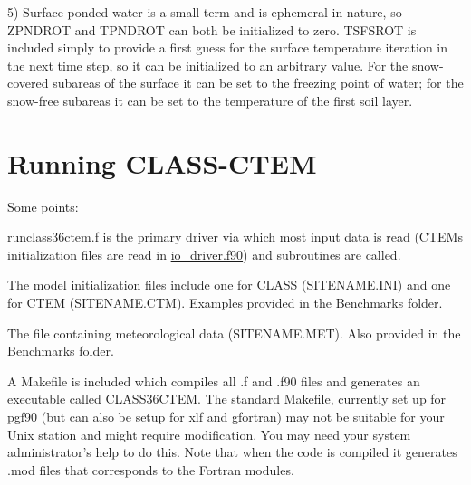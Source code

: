 5) Surface ponded water is a small term and is ephemeral in nature, so Z\+P\+N\+D\+R\+O\+T and T\+P\+N\+D\+R\+O\+T can both be initialized to zero. T\+S\+F\+S\+R\+O\+T is included simply to provide a first guess for the surface temperature iteration in the next time step, so it can be initialized to an arbitrary value. For the snow-\/covered subareas of the surface it can be set to the freezing point of water; for the snow-\/free subareas it can be set to the temperature of the first soil layer.\hypertarget{index_runStandAloneMode}{}\section{Running C\+L\+A\+S\+S-\/\+C\+T\+E\+M}\label{index_runStandAloneMode}
Some points\+:
\begin{DoxyEnumerate}
\item runclass36ctem.\+f is the primary driver via which most input data is read (C\+T\+E\+M\textquotesingle{}s initialization files are read in \hyperlink{io__driver_8f90}{io\+\_\+driver.\+f90}) and subroutines are called.
\item The model initialization files include one for C\+L\+A\+S\+S (S\+I\+T\+E\+N\+A\+M\+E.\+I\+N\+I) and one for C\+T\+E\+M (S\+I\+T\+E\+N\+A\+M\+E.\+C\+T\+M). Examples provided in the Benchmarks folder.
\item The file containing meteorological data (S\+I\+T\+E\+N\+A\+M\+E.\+M\+E\+T). Also provided in the Benchmarks folder.
\item A Makefile is included which compiles all .f and .f90 files and generates an executable called C\+L\+A\+S\+S36\+C\+T\+E\+M. The standard Makefile, currently set up for pgf90 (but can also be setup for xlf and gfortran) may not be suitable for your Unix station and might require modification. You may need your system administrator’s help to do this. Note that when the code is compiled it generates .mod files that corresponds to the Fortran modules.
\end{DoxyEnumerate}

